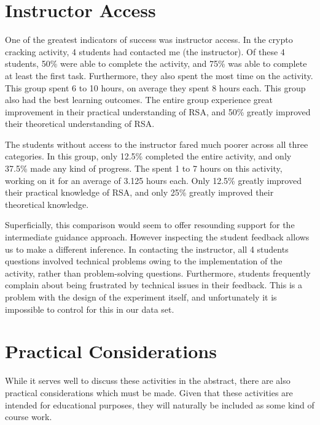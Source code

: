 
    \section{Instructor Access}
        One of the greatest indicators of success was instructor access. 
        In the crypto cracking activity, 4 students had contacted me (the instructor). 
        Of these 4 students, 50\% were able to complete the activity, and 75\% was able to complete at least the first task. 
        Furthermore, they also spent the most time on the activity. 
        This group spent 6 to 10 hours, on average they spent 8 hours each. 
        This group also had the best learning outcomes. 
        The entire group experience great improvement in their practical understanding of RSA, and 50\% greatly improved their theoretical understanding of RSA.

        The students without access to the instructor fared much poorer across all three categories. 
        In this group, only 12.5\% completed the entire activity, and only 37.5\% made any kind of progress. 
        The spent 1 to 7 hours on this activity, working on it for an average of 3.125 hours each. 
        Only 12.5\% greatly improved their practical knowledge of RSA, and only 25\% greatly improved their theoretical knowledge. 

        Superficially, this comparison would seem to offer resounding support for the intermediate guidance approach. 
        However inspecting the student feedback allows us to make a different inference. 
        In contacting the instructor, all 4 students questions involved technical problems owing to the implementation of the activity, rather than problem-solving questions. 
        Furthermore, students frequently complain about being frustrated by technical issues in their feedback. 
        This is a problem with the design of the experiment itself, and unfortunately it is impossible to control for this in our data set. 

\section{Practical Considerations}
    While it serves well to discuss these activities in the abstract, there are also practical considerations which must be made. 
    Given that these activities are intended for educational purposes, they will naturally be included as some kind of course work.

